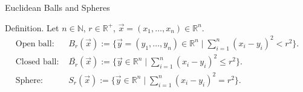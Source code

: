 
\date{27 October 2025}



\begin{frame}
  \cmctitleframe
\end{frame}


\begin{frame}{Euclidean Balls and Spheres}
\begin{block}{Definition.}
Let $n\in\mathbb{N}$, $r\in\mathbb{R}^+$, $\vec{x}=(x_1,\dots,x_n)\in\mathbb{R}^n$.
\begin{align*}
\text{Open ball: } & B_r(\vec{x}) := \bigl\{\vec{y}=(y_1,\dots,y_n)\in\mathbb{R}^n \mid \sum_{i=1}^n (x_i-y_i)^2 < r^2 \bigr\}.\\
\text{Closed ball: } & \overline{B_r}(\vec{x}) := \bigl\{\vec{y}\in\mathbb{R}^n \mid \sum_{i=1}^n (x_i-y_i)^2 \le r^2 \bigr\}.\\
\text{Sphere: } & S_r(\vec{x}) := \bigl\{\vec{y}\in\mathbb{R}^n \mid \sum_{i=1}^n (x_i-y_i)^2 = r^2 \bigr\}.
\end{align*}

\end{block}
\end{frame}

